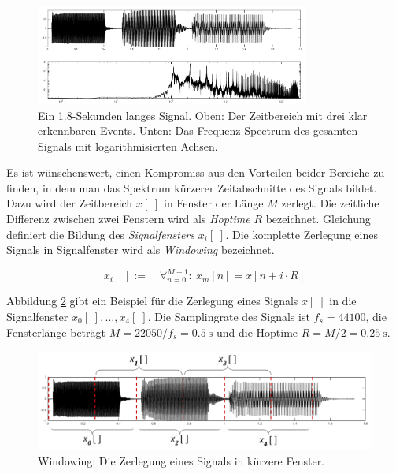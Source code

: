 \begin{figure}[h]
	\centering
	\includegraphics[width=0.8\textwidth]{bilder/stft01.png}
	\caption{Ein 1.8-Sekunden langes Signal. Oben: Der Zeitbereich mit drei klar erkennbaren Events. Unten: Das Frequenz-Spectrum des gesamten Signals mit logarithmisierten Achsen.}
	\label{img:stft01}
\end{figure}

Es ist wünschenswert, einen Kompromiss aus den Vorteilen beider Bereiche zu finden, in dem man das Spektrum kürzerer Zeitabschnitte des Signals bildet. Dazu wird der Zeitbereich $x[\;]$ in Fenster der Länge $M$ zerlegt. Die zeitliche Differenz zwischen zwei Fenstern wird als \emph{Hoptime} $R$ bezeichnet. Gleichung definiert die Bildung des \emph{Signalfensters} $x_i[\;]$. Die komplette Zerlegung eines Signals in Signalfenster wird als \emph{Windowing} bezeichnet.\cite{juliusSmith}

\begin{equation}
x_i[\;] := \quad \mathop{\forall}_{n = 0}^{M-1} :\ x_{m}[n] = x[n+i\cdot R]
\label{eq:signal-Window}
\end{equation}

Abbildung \ref{img:siganlWindows} gibt ein Beispiel für die Zerlegung eines Signals $x[\;]$ in die Signalfenster $x_0[\;] ,\ldots, x_4[\;]$. Die Samplingrate des Signals ist $f_s = 44100$, die Fensterlänge beträgt $M = 22050 / f_s = \SI{0.5}{\second}$ und die Hoptime $R = M / 2= \SI{0.25}{\second}$.

\begin{figure}[h]
	\centering
	\includegraphics[width=1\textwidth]{bilder/signalWindows02.png}
	\caption{Windowing: Die Zerlegung eines Signals in kürzere Fenster.}
	\label{img:siganlWindows}
\end{figure}

